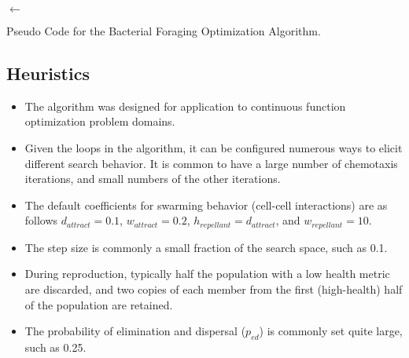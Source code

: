 \begin{algorithm}[Htp]
{		%
		\ForEach{\Cell $\in$ \Population} {
			\If{\Rand{} $\leq$ \ProbElimination} {
				\Cell $\leftarrow$ \CreateCellAtRandomLocation{}\;
			}
		}
	}
	
	\Return{\Best}\;
	\caption{Pseudo Code for the Bacterial Foraging Optimization Algorithm.}
	\label{alg:bfoa}
\end{algorithm}

\subsection{Heuristics}
\begin{itemize}
	\item The algorithm was designed for application to continuous function optimization problem domains.
	\item Given the loops in the algorithm, it can be configured numerous ways to elicit different search behavior. It is common to have a large number of chemotaxis iterations, and small numbers of the other iterations.
	\item The default coefficients for swarming behavior (cell-cell interactions) are as follows $d_{attract}=0.1$, $w_{attract}=0.2$, $h_{repellant}=d_{attract}$, and $w_{repellant}=10$.	
	\item The step size is commonly a small fraction of the search space, such as 0.1.
	\item During reproduction, typically half the population with a low health metric are discarded, and two copies of each member from the first (high-health) half of the population are retained.
	\item The probability of elimination and dispersal ($p_{ed}$) is commonly set quite large, such as 0.25.
\end{itemize}

